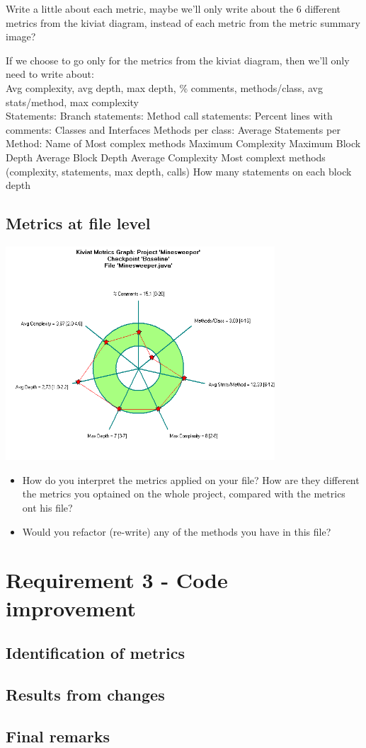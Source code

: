 \documentclass[UKenglish]{article}  %
\begin{document}
Write a little about each metric, maybe we'll only write about the 6 different metrics from the kiviat diagram, instead of each metric from the metric summary image?

If we choose to go only for the metrics from the kiviat diagram, then we'll only need to write about:\\
Avg complexity, avg depth, max depth, \% comments, methods/class, avg stats/method, max complexity\\

Statements:
Branch statements:
Method call statements:
Percent lines with comments:
Classes and Interfaces
Methods per class:
Average Statements per Method:
Name of Most complex methods
Maximum Complexity
Maximum Block Depth
Average Block Depth
Average Complexity
Most complext methods (complexity, statements, max depth, calls)
How many statements on each block depth



\subsection{Metrics at file level}
\includegraphics[height=8cm]{kiviat_diagram_minesweeper}
\begin{itemize}
\item How do you interpret the metrics applied on your file? How are they different the metrics you optained on the whole project, compared with the metrics ont his file?\\
\item Would you refactor (re-write) any of the methods you have in this file?
\end{itemize}
\section{Requirement 3 - Code improvement}

\subsection{Identification of metrics}

\subsection{Results from changes}

\subsection{Final remarks}
\end{document}

